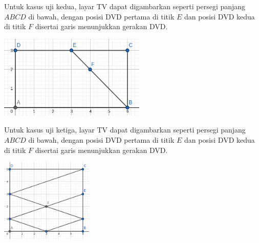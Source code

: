 \documentclass{article}
\begin{document}
Untuk kasus uji kedua, layar TV dapat digambarkan seperti persegi panjang $ABCD$ di bawah, dengan posisi DVD pertama di titik $E$ dan posisi DVD kedua di titik $F$ disertai garis menunjukkan gerakan DVD.

\includegraphics[height=150px]{sample-2}

Untuk kasus uji ketiga, layar TV dapat digambarkan seperti persegi panjang $ABCD$ di bawah, dengan posisi DVD pertama di titik $E$ dan posisi DVD kedua di titik $F$ disertai garis menunjukkan gerakan DVD.

\includegraphics[height=150px]{sample-3}

\pagebreak
\end{document}
